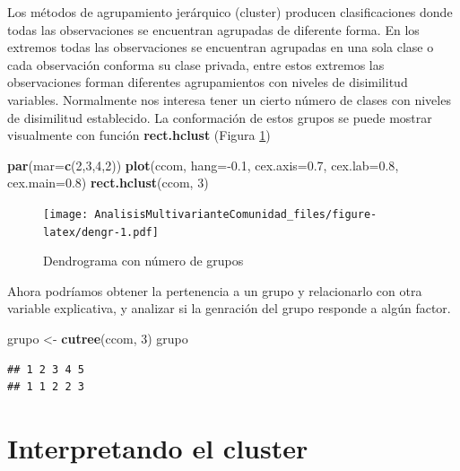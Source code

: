 \documentclass[]{book}
\newenvironment{Shaded}{\begin{snugshade}}{\end{snugshade}}
\newcommand{\KeywordTok}[1]{\textcolor[rgb]{0.13,0.29,0.53}{\textbf{{#1}}}}
\newcommand{\DataTypeTok}[1]{\textcolor[rgb]{0.13,0.29,0.53}{{#1}}}
\newcommand{\DecValTok}[1]{\textcolor[rgb]{0.00,0.00,0.81}{{#1}}}
\newcommand{\FloatTok}[1]{\textcolor[rgb]{0.00,0.00,0.81}{{#1}}}
\newcommand{\StringTok}[1]{\textcolor[rgb]{0.31,0.60,0.02}{{#1}}}
\newcommand{\NormalTok}[1]{{#1}}
\begin{document}
Los métodos de agrupamiento jerárquico (cluster) producen
clasificaciones donde todas las observaciones se encuentran agrupadas de
diferente forma. En los extremos todas las observaciones se encuentran
agrupadas en una sola clase o cada observación conforma su clase
privada, entre estos extremos las observaciones forman diferentes
agrupamientos con niveles de disimilitud variables. Normalmente nos
interesa tener un cierto número de clases con niveles de disimilitud
establecido. La conformación de estos grupos se puede mostrar
visualmente con función \textbf{rect.hclust} (Figura \ref{fig:dengr})

\begin{Shaded}
\begin{Highlighting}[]
\KeywordTok{par}\NormalTok{(}\DataTypeTok{mar=}\KeywordTok{c}\NormalTok{(}\DecValTok{2}\NormalTok{,}\DecValTok{3}\NormalTok{,}\DecValTok{4}\NormalTok{,}\DecValTok{2}\NormalTok{))}
\KeywordTok{plot}\NormalTok{(ccom, }\DataTypeTok{hang=}\NormalTok{-}\FloatTok{0.1}\NormalTok{, }\DataTypeTok{cex.axis=}\FloatTok{0.7}\NormalTok{, }\DataTypeTok{cex.lab=}\FloatTok{0.8}\NormalTok{, }\DataTypeTok{cex.main=}\FloatTok{0.8}\NormalTok{)}
\KeywordTok{rect.hclust}\NormalTok{(ccom, }\DecValTok{3}\NormalTok{)}
\end{Highlighting}
\end{Shaded}

\begin{figure}[htbp]
\centering
\texttt{[image: AnalisisMultivarianteComunidad\_files/figure-latex/dengr-1.pdf]}
\caption{\label{fig:dengr}Dendrograma con número de grupos}
\end{figure}

Ahora podríamos obtener la pertenencia a un grupo y relacionarlo con
otra variable explicativa, y analizar si la genración del grupo responde
a algún factor.

\begin{Shaded}
\begin{Highlighting}[]
\NormalTok{grupo <-}\StringTok{ }\KeywordTok{cutree}\NormalTok{(ccom, }\DecValTok{3}\NormalTok{)}
\NormalTok{grupo}
\end{Highlighting}
\end{Shaded}

\begin{verbatim}
## 1 2 3 4 5 
## 1 1 2 2 3
\end{verbatim}

\section{Interpretando el cluster}\label{interpretando-el-cluster}
\end{document}
